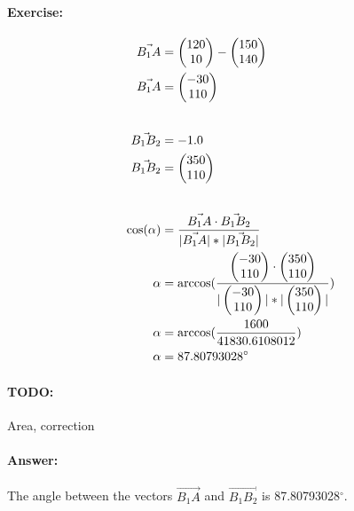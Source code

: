 \paragraph{Exercise:} 
\begin{align}
    \vec{B_1A} &= \vA - \vBOne \\
    \vec{B_1A} &= \vBOneA  \\[20pt]
    \vec{B_1B_2} &= \pgfmathparse{1 - 2} \pgfmathresult \\
    \vec{B_1B_2} &= \vBOneBTwo \\[20pt]
    \cos(\alpha) &= \frac{\vec{B_1A} \cdot \vec{B_1B_2}}{|\vec{B_1A}| * |\vec{B_1B_2}|} \\
    \alpha &= \arccos(\frac{\vBOneA \cdot \vBOneBTwo}{|\vBOneA| * |\vBOneBTwo|}) \\
    \alpha &= \arccos(\frac{1600}{41830.6108012}) \\
    \alpha &= 87.80793028^\circ 
\end{align}

\paragraph{TODO:}
Area, correction

\paragraph{Answer:}
The angle between the vectors $\vec{B_1A}$ and $\vec{B_1B_2}$ is 87.80793028$^\circ$.
